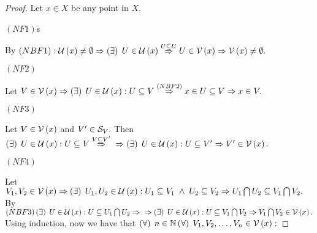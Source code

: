 \documentclass[a4paper,12pt]{report}
\newcommand{\nbh}[1]
{
\cg{V}\left(#1\right)
}
\newcommand{\nbhb}[1]
{
\cg{U}\left(#1\right)
}
\begin{document}
\begin{proof}
\sufficiency

Let $x\in X$ be any point in $X$.

\begin{center}
$\left(NF1\right)$s
\end{center}
By $\left(NBF1\right): \nbhb{x} \neq \emptyset \Rightarrow \fe{\exists} U \in \nbhb{x} \overset{U\subseteq U}{\Rightarrow} U\in\nbh{x} \Rightarrow \nbh{x} \neq \emptyset.$

\begin{center}
$\left(NF2\right)$
\end{center}

Let $V\in \nbh{x} \Rightarrow \fe{\exists} U \in \nbhb{x}: U\subseteq V \overset{\left(NBF2\right)}{\Rightarrow} x\in U\subseteq V \Rightarrow x\in V. $

\begin{center}
$\left(NF3\right)$
\end{center}

Let $V\in \nbh{x} $ and $V'\in \mathcal{S}_V.$ Then $\fe{\exists} U\in\nbhb{x}: U\subseteq V \overset{V\subseteq V'}{\Rightarrow} \\ \Rightarrow \fe{\exists} U\in\nbhb{x}: U\subseteq V' \Rightarrow V'\in\nbh{x}.$

\begin{center}
$\left(NF4\right)$
\end{center}

Let $V_1,V_2 \in \nbh{x} \Rightarrow \fe{\exists} U_1,U_2 \in \nbhb{x}: U_1 \subseteq V_1 \;\land \; U_2\subseteq V_2 \\ \Rightarrow U_1\bigcap U_2\subseteq V_1\bigcap V_2.$ By $\left(NBF3\right) \fe{\exists} U\in\nbhb{x}: U\subseteq U_1\bigcap U_2 \Rightarrow \\ \Rightarrow \fe{\exists} U \in\nbhb{x}: U\subseteq V_1\bigcap V_2 \Rightarrow V_1\bigcap V_2 \in\nbh{x}.$\\
Using induction, now we have that $\fe{\forall} n\in\mathbb{N} \fe{\forall} V_1,V_2,\dots ,V_n \in \nbh{x}:  $

\end{proof}
\end{document}
